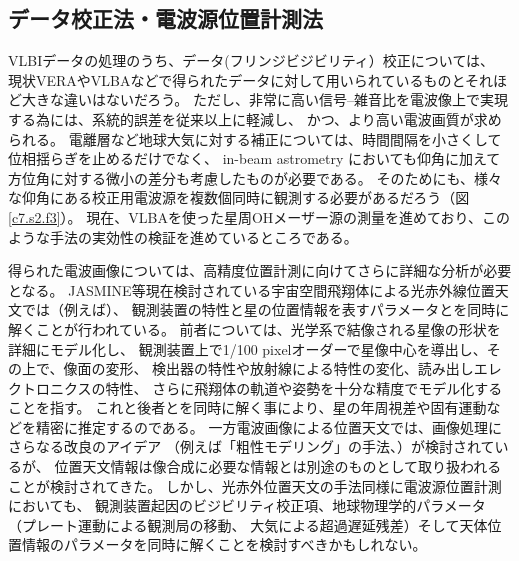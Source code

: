 \setcounter{subsection}{2}\subsection{データ校正法・電波源位置計測法}\label{c7.s2.ss3}

VLBIデータの処理のうち、データ(フリンジビジビリティ）校正については、
現状VERAやVLBAなどで得られたデータに対して用いられているものとそれほど大きな違いはないだろう。
ただし、非常に高い信号--雑音比を電波像上で実現する為には、系統的誤差を従来以上に軽減し、
かつ、より高い電波画質が求められる。
電離層など地球大気に対する補正については、時間間隔を小さくして位相揺らぎを止めるだけでなく、
in-beam astrometry においても仰角に加えて方位角に対する微小の差分も考慮したものが必要である。
そのためにも、様々な仰角にある校正用電波源を複数個同時に観測する必要があるだろう（図\ref{c7.s2.f3}）。
現在、VLBAを使った星周OHメーザー源の測量を進めており、このような手法の実効性の検証を進めているところである。

得られた電波画像については、高精度位置計測に向けてさらに詳細な分析が必要となる。
JASMINE等現在検討されている宇宙空間飛翔体による光赤外線位置天文では（例えば\citealt{2012A&A...538A..78L}）、
観測装置の特性と星の位置情報を表すパラメータとを同時に解くことが行われている。
前者については、光学系で結像される星像の形状を詳細にモデル化し、
観測装置上で1/100 pixelオーダーで星像中心を導出し、その上で、像面の変形、
検出器の特性や放射線による特性の変化、読み出しエレクトロニクスの特性、
さらに飛翔体の軌道や姿勢を十分な精度でモデル化することを指す。
これと後者とを同時に解く事により、星の年周視差や固有運動などを精密に推定するのである。
一方電波画像による位置天文では、画像処理にさらなる改良のアイデア
（例えば「粗性モデリング」の手法、\citealt{2014PASJ...66...95H}）が検討されているが、
位置天文情報は像合成に必要な情報とは別途のものとして取り扱われることが検討されてきた。
しかし、光赤外位置天文の手法同様に電波源位置計測においても、
観測装置起因のビジビリティ校正項、地球物理学的パラメータ（プレート運動による観測局の移動、
大気による超過遅延残差）そして天体位置情報のパラメータを同時に解くことを検討すべきかもしれない。

